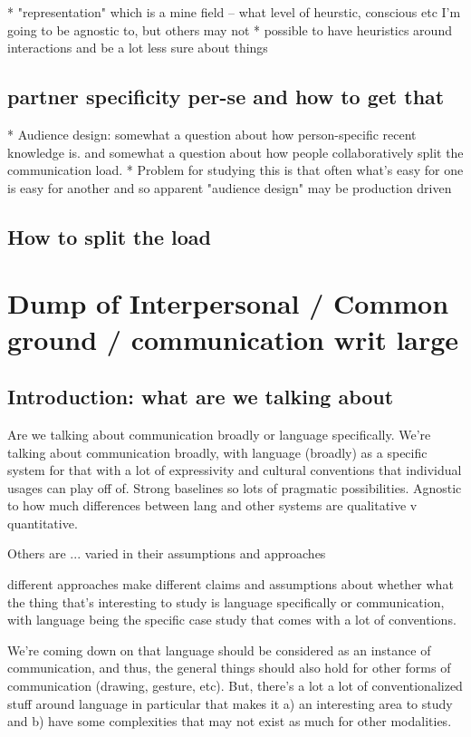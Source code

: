\documentclass[]{article}
\begin{document}
* "representation" which is a mine field -- what level of heurstic, conscious etc I'm going to be agnostic to, but others may not
* possible to have heuristics around interactions and be a lot less sure about things

\subsection{partner specificity per-se and how to get that}

* Audience design: somewhat a question about how person-specific recent knowledge is. and somewhat a question about how people collaboratively split the communication load. 
* Problem for studying this is that often what's easy for one is easy for another and so apparent "audience design" may be production driven 

\subsection{How to split the load}


\section{Dump of Interpersonal / Common ground / communication writ large}

\subsection{Introduction: what are we talking about}
Are we talking about communication broadly or language specifically. 
We're talking about communication broadly, with language (broadly) as a specific system for that with a lot of expressivity and cultural conventions that individual usages can play off of. Strong baselines so lots of pragmatic possibilities. 
Agnostic to how much differences between lang and other systems are qualitative v quantitative. 

Others are ... varied in their assumptions and approaches 

different approaches make different claims and assumptions about whether what the thing that's interesting to study is language specifically or communication, with language being the specific case study that comes with a lot of conventions. 

We're coming down on that language should be considered as an instance of communication, and thus, the general things should also hold for other forms of communication (drawing, gesture, etc). But, there's a lot a lot of conventionalized stuff around language in particular that makes it a) an interesting area to study and b) have some complexities that may not exist as much for other modalities. 
\end{document}
